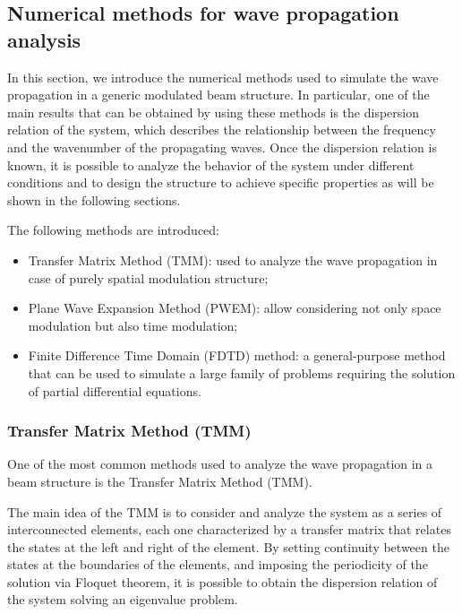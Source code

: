 \subsection{Numerical methods for wave propagation analysis}
\label{subsec:numerical_methods_for_wave_propagation_analysis}

In this section, we introduce the numerical methods used to simulate the wave propagation in a generic modulated beam structure.
In particular, one of the main results that can be obtained by using these methods is the dispersion relation of the system, which describes the relationship between the frequency and the wavenumber of the propagating waves.
Once the dispersion relation is known, it is possible to analyze the behavior of the system under different conditions and to design the structure to achieve specific properties as will be shown in the following sections.

The following methods are introduced:

\begin{itemize}
    \item Transfer Matrix Method (TMM): used to analyze the wave propagation in case of purely spatial modulation structure;
    \item Plane Wave Expansion Method (PWEM): allow considering not only space modulation but also time modulation;
    \item Finite Difference Time Domain (FDTD) method: a general-purpose method that can be used to simulate a large family of problems requiring the solution of partial differential equations.
\end{itemize}



\subsubsection{Transfer Matrix Method (TMM)}
\label{subsubsec:transfer_matrix_method_tmm}

One of the most common methods used to analyze the wave propagation in a beam structure is the Transfer Matrix Method (TMM).

The main idea of the TMM is to consider and analyze the system as a series of interconnected elements, each one characterized by a transfer matrix that relates the states at the left and right of the element.
By setting continuity between the states at the boundaries of the elements, and imposing the periodicity of the solution via Floquet theorem, it is possible to obtain the dispersion relation of the system solving an eigenvalue problem.

